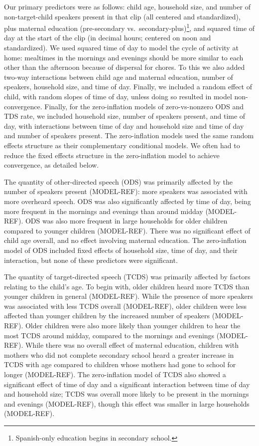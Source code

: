 \documentclass[floatsintext,man]{apa6}
\theoremstyle{definition}
\theoremstyle{definition}
\theoremstyle{definition}
\theoremstyle{remark}
\begin{document}
Our primary predictors were as follows: child age, household size, and
number of non-target-child speakers present in that clip (all centered
and standardized), plus maternal education (pre-secondary
vs.~secondary-plus)\footnote{Spanish-only education begins in secondary school.},
and squared time of day at the start of the clip (in decimal hours;
centered on noon and standardized). We used squared time of day to model
the cycle of activity at home: mealtimes in the mornings and evenings
should be more similar to each other than the afternoon because of
dispersal for chores. To this we also added two-way interactions between
child age and maternal education, number of speakers, household size,
and time of day. Finally, we included a random effect of child, with
random slopes of time of day, unless doing so resulted in model
non-convergence. Finally, for the zero-inflation models of
zero-vs-nonzero ODS and TDS rate, we included household size, number of
speakers present, and time of day, with interactions between time of day
and household size and time of day and number of speakers present. The
zero-inflation models used the same random effects structure as their
complementary conditional models. We often had to reduce the fixed
effects structure in the zero-inflation model to achieve convergence, as
detailed below.

The quantity of other-directed speech (ODS) was primarily affected by
the number of speakers present (MODEL-REF): more speakers was associated
with more overheard speech. ODS was also significantly affected by time
of day, being more frequent in the mornings and evenings than around
midday (MODEL-REF). ODS was also more frequent in large households for
older children compared to younger children (MODEL-REF). There was no
significant effect of child age overall, and no effect involving
maternal education. The zero-inflation model of ODS included fixed
effects of household size, time of day, and their interaction, but none
of these predictors were significant.

The quantity of target-directed speech (TCDS) was primarily affected by
factors relating to the child's age. To begin with, older children heard
more TCDS than younger children in general (MODEL-REF). While the
presence of more speakers was associated with less TCDS overall
(MODEL-REF), older children were less affected than younger children by
the increased number of speakers (MODEL-REF). Older children were also
more likely than younger children to hear the most TCDS around midday,
compared to the mornings and evenings (MODEL-REF). While there was no
overall effect of maternal education, children with mothers who did not
complete secondary school heard a greater increase in TCDS with age
compared to children whose mothers had gone to school for longer
(MODEL-REF). The zero-inflation model of TCDS also showed a significant
effect of time of day and a significant interaction between time of day
and household size; TCDS was overall more likely to be present in the
mornings and evenings (MODEL-REF), though this effect was smaller in
large households (MODEL-REF).
\end{document}
